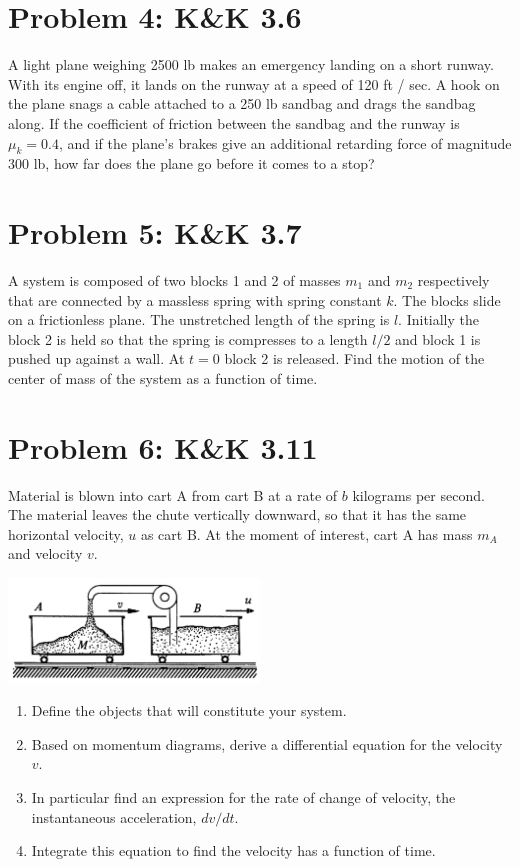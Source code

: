 \documentclass[problems]{esg8012pset}
\begin{document}
\section*{Problem 4: K\&K 3.6}
  A light plane weighing 2500 lb makes an emergency landing on a short runway. With its engine off, it lands on the runway at a speed of 120 ft / sec. A hook on the plane snags a cable attached to a 250 lb sandbag and drags the sandbag along. If the coefficient of friction between the sandbag and the runway is $\mu_k = 0.4$, and if the plane's brakes give an additional retarding force of magnitude 300 lb, how far does the plane go before it comes to a stop?
\section*{Problem 5: K\&K 3.7}
  A system is composed of two blocks 1 and 2 of masses $m_1$ and $m_2$ respectively that are connected by a massless spring with spring constant $k$. The blocks slide on a frictionless plane. The unstretched length of the spring is $l$. Initially the block 2 is held so that the spring is compresses to a length $l / 2$ and block 1 is pushed up against a wall. At $t = 0$ block 2 is released. Find the motion of the center of mass of the system as a function of time.
\section*{Problem 6: K\&K 3.11}
  Material is blown into cart A from cart B at a rate of $b$ kilograms per second. The material leaves the chute vertically downward, so that it has the same horizontal velocity, $u$ as cart B. At the moment of interest, cart A has mass $m_A$ and velocity $v$.
  \begin{center}\includegraphics[width=0.5\textwidth]{ps_04_2}\end{center}
  \begin{enumerate}
    \item Define the objects that will constitute your system.
    \item Based on momentum diagrams, derive a differential equation for the velocity $v$.
    \item In particular find an expression for the rate of change of velocity, the instantaneous acceleration, $d v / d t$.
    \item Integrate this equation to find the velocity has a function of time.
  \end{enumerate}
\end{document}
